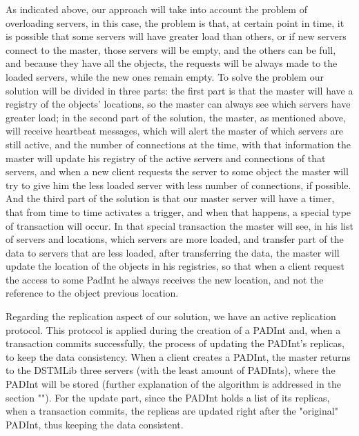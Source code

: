 \documentclass[times, 10pt,twocolumn]{article}
\begin{document}
As indicated above, our approach will take into account the problem of overloading servers, in this case, the problem is that, at certain point in time, it is possible that some servers will have greater load than others, or if new servers connect to the master, those servers will be empty, and the others can be full, and because they have all the objects, the requests will be always made to the loaded servers, while the new ones remain empty. To solve the problem our solution will be divided in three parts: the first part is that the master will have a registry of the objects' locations, so the master can always see which servers have greater load; in the second part of the solution, the master, as mentioned above, will receive heartbeat messages, which will alert the master of which servers are still active, and the number of connections at the time, with that information the master will update his registry of the active servers and connections of that servers, and when a new client requests the server to some object the master will try to give him the less loaded server with less number of connections, if possible. And the third part of the solution is that our master server will have a timer, that from time to time activates a trigger, and when that happens, a special type of transaction will occur. In that special transaction the master will see, in his list of servers and locations, which servers are more loaded, and transfer part of the data to servers that are less loaded, after transferring the data, the master will update the location of the objects in his registries, so that when a client request the access to some PadInt he always receives the new location, and not the reference to the object previous location.


Regarding the replication aspect of our solution, we have an active replication protocol. This protocol is applied during the creation of a PADInt and, when a transaction commits successfully, the process of updating the PADInt's replicas, to keep the data consistency.
When a client creates a PADInt, the master returns to the DSTMLib three servers (with the least amount of PADInts), where the PADInt will be stored (further explanation of the algorithm is addressed in the section ""). For the update part, since the PADInt holds a list of its replicas, when a transaction commits, the replicas are updated right after the "original" PADInt, thus keeping the data consistent.
\end{document}
